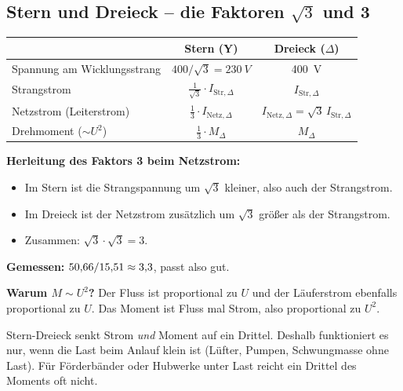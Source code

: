 \documentclass[11pt,a4paper]{article}
\begin{document}
\subsection{Stern und Dreieck -- die Faktoren \texorpdfstring{$\sqrt3$}{Wurzel 3} und 3}
\begin{center}
\begin{tabular}{@{}lcc@{}}
\toprule
& Stern (Y) & Dreieck ($\Delta$)\\
\midrule
Spannung am Wicklungsstrang & $400/\sqrt3 = \SI{230}{V}$ & \SI{400}{V}\\
Strangstrom & $\frac{1}{\sqrt3}\cdot I_{\mathrm{Str},\Delta}$ & $I_{\mathrm{Str},\Delta}$\\
Netzstrom (Leiterstrom) & $\frac13\cdot I_{\mathrm{Netz},\Delta}$ & $I_{\mathrm{Netz},\Delta} = \sqrt3\, I_{\mathrm{Str},\Delta}$\\
Drehmoment ($\sim U^2$) & $\frac13\cdot M_\Delta$ & $M_\Delta$\\
\bottomrule
\end{tabular}
\end{center}
\textbf{Herleitung des Faktors 3 beim Netzstrom:}
\begin{itemize}
\item Im Stern ist die Strangspannung um $\sqrt3$ kleiner, also auch der Strangstrom.
\item Im Dreieck ist der Netzstrom zusätzlich um $\sqrt3$ größer als der Strangstrom.
\item Zusammen: $\sqrt3\cdot\sqrt3 = 3$.
\end{itemize}
\textbf{Gemessen:} $50{,}66/15{,}51 \approx 3{,}3$, passt also gut.

\textbf{Warum $M \sim U^2$?} Der Fluss ist proportional zu $U$ und der Läuferstrom
ebenfalls proportional zu $U$. Das Moment ist Fluss mal Strom, also proportional zu $U^2$.

\begin{merke}
Stern-Dreieck senkt Strom \emph{und} Moment auf ein Drittel. Deshalb funktioniert es nur,
wenn die Last beim Anlauf klein ist (Lüfter, Pumpen, Schwungmasse ohne Last). Für
Förderbänder oder Hubwerke unter Last reicht ein Drittel des Moments oft nicht.
\end{merke}
\end{document}
